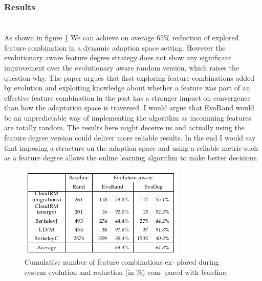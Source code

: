 \documentclass[pdftex,english,oribibl]{llncs}
\begin{document}
\subsubsection{Results \\\\}
As shown in figure \ref{fig:featureModelResults}
We can achieve on average 65\% reduction of explored feature combination in a dynamic adaption space setting. 
However the evolutionary aware feature degree strategy does not show any significant improvement over the evolutionary aware random version, which raises the question why. The paper argues that first exploring
feature combinations added by evolution and exploiting
knowledge about whether a feature was part of an effective
feature combination in the past has a stronger impact on
convergence than how the adaptation space is traversed. I would argue that EvoRand would be an unpredictable way of implementing the algorithm as incomming features are totally random. The results here might deceive us and actually using the feature degree version could deliver more reliable results. In the end I would say that imposing a structure on the adaption space and using a reliable metric such as a feature degree allows the online learning algorithm to make better decisions. 
\begin{figure}[H]
\centering
	\includegraphics[totalheight=6cm]{figures/featureModelResults}
    \caption{Cumulative number of feature combinations ex-
plored during system evolution and reduction (in \%) com-
pared with baseline. \cite{featureModelGuidedLearning}}
    \label{fig:featureModelResults}
\end{figure}
\end{document}
